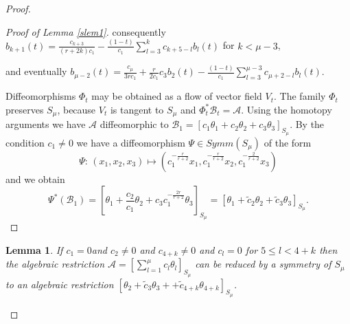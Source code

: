 \documentclass{amsart}
\newtheorem{lem}[thm]{Lemma}
\theoremstyle{definition}
\numberwithin{equation}{section}
\begin{document}
\begin{proof}
\begin{proof}[Proof of Lemma \ref{slem1}]
  \noindent  consequently $b_{k+1}(t)=\frac{c_{k+3}}{(r+2k)c_1}-\frac{(1-t)}{c_1}\sum_{l=3}^k c_{k+5-l}b_l(t)$ for $k<\mu-3$,

  \noindent and eventually $b_{\mu-2}(t)=\frac{c_{\mu}}{3rc_1}+ \frac{r}{2c_1}c_3b_2(t)-\frac{(1-t)}{c_1}\sum_{l=3}^{\mu-3} c_{\mu+2-l}b_l(t)$.

\smallskip

  Diffeomorphisms $\Phi_t$ may be obtained as a flow of vector field $V_t$.
The family $\Phi_t$ preserves $S_{\mu}$, because $V_t$ is tangent to $S_{\mu}$ and $\Phi_t^*\mathcal{B}_t=\mathcal{A}$.
Using the homotopy arguments we have $\mathcal{A}$ diffeomorphic to $ \mathcal{B}_1=[c_1 \theta_1+c_2 \theta_2+c_3 \theta_3]_{S_{\mu}}$.
By the condition $c_1\ne 0$ we have a diffeomorphism $\Psi \in Symm(S_{\mu})$ of the form
  \begin{equation}
\label{proofslem14}
\Psi:\,(x_1,x_2,x_3)\mapsto (c_1^{-\frac{r}{r+2}} x_1,c_1^{-\frac{r}{r+2}} x_2,c_1^{-\frac{2}{r+2}} x_3)
\end{equation}
and we obtain
\[ \Psi^*(\mathcal{B}_1)=[ \theta_1+ \frac{c_2}{c_1}\theta_2+c_3 c_1^{-\frac{2r}{r+2}} \theta_3]_{S_{\mu}} =
 [ \theta_1+ \widetilde{c}_2 \theta_2+\widetilde{c}_3 \theta_3]_{S_{\mu}}.\]
 
\end{proof}

\begin{lem}
\label{slem2} If \;$c_1= 0$\;and $c_2 \neq 0$ and $c_{4+k} \ne 0$ and $c_l=0$ for $5\leq l< 4+k$  then the algebraic restriction $\mathcal{A}=[ \sum_{l=1}^{\mu}c_{l} \theta_{l}]_{S_{\mu}}$ can be reduced by a symmetry of $S_{\mu}$ to an algebraic restriction $[\theta_2+ \widetilde{c}_3\theta_3+ +\widetilde{c}_{4+k} \theta_{4+k}]_{S_{\mu}}$.
\end{lem}


\end{proof}
\end{document}
